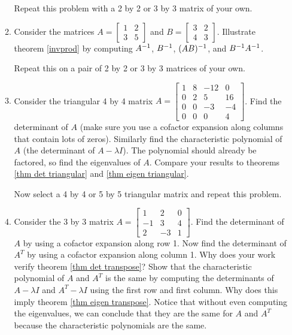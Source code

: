 \begin{enumerate}
\begin{enumerate}
  Repeat this problem with a 2 by 2 or 3 by 3 matrix of your own.
  
  
  \item Consider the matrices 
    $A=\begin{bmatrix}
	1 & 2 \\
	3 & 5
	\end{bmatrix}$ and 
	  $B=\begin{bmatrix}
	3 & 2 \\
	4 & 3
	\end{bmatrix}$.
	Illustrate theorem \ref{invprod} by computing $A^{-1}$, $B^{-1}$, $(AB)^{-1}$, and $B^{-1} A^{-1}$. 
  
  Repeat this on a pair of 2 by 2 or 3 by 3 matrices of your own.

  \item  Consider the triangular 4 by 4 matrix 
  $A=\begin{bmatrix}
	1 & 8 & -12& 0 \\
	0 & 2 & 5& 16 \\
	0 & 0 & -3& -4 \\
	0 & 0 & 0& 4
	\end{bmatrix}$.  
	Find the determinant of $A$ (make sure you use a cofactor expansion along columns that contain lots of zeros). Similarly find the characteristic polynomial of $A$ (the determinant of $A-\lambda I$). The polynomial should already be factored, so find the eigenvalues of $A$. Compare your results to theorems \ref{thm det triangular} and \ref{thm eigen triangular}.
	
	Now select a 4 by 4 or 5 by 5 triangular matrix and repeat this problem.
  
  \item Consider the 3 by 3 matrix 
  $A = 
\begin{bmatrix}
1&2&0\\
-1&3&4\\
2&-3&1
\end{bmatrix}
$. 
  Find the determinant of $A$ by using a cofactor expansion along row 1. 
  Now find the determinant of $A^T$ by using a cofactor expansion along column 1. Why does your work verify  theorem \ref{thm det transpose}? 
  Show that the characteristic polynomial of $A$ and $A^T$ is the same by computing the determinants of $A-\lambda I$ and $A^T-\lambda I$ using the first row and first column.
  Why does this imply theorem \ref{thm eigen transpose}. Notice that without even computing the eigenvalues, we can conclude that they are the same for $A$ and $A^T$ because the characteristic polynomials are the same.


\end{enumerate}
\end{enumerate}
